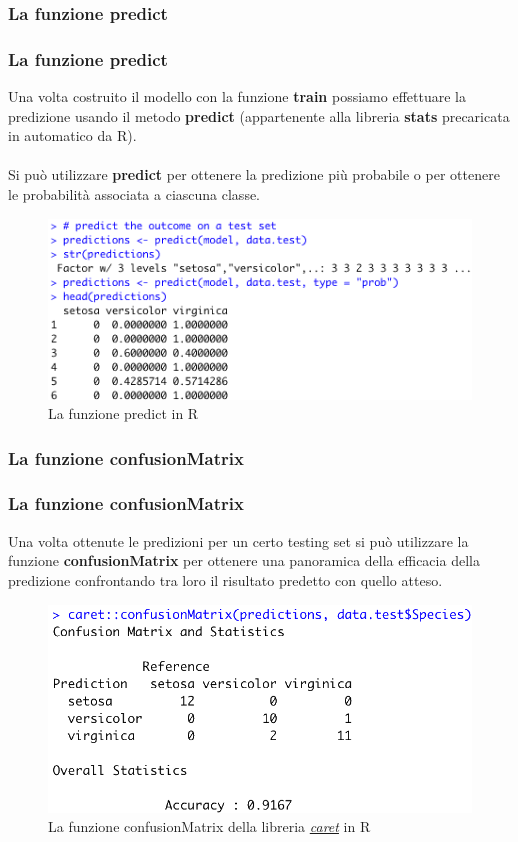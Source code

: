 \subsubsection[La funzione predict]{La funzione predict}
\begin{frame}
	
	\frametitle{La funzione \textbf{predict}}
	
	
	Una volta costruito il modello con la funzione \textbf{train} possiamo effettuare la predizione usando il metodo \textbf{predict} (appartenente alla libreria	 \textbf{stats} precaricata in automatico da R).\\\\
	Si può utilizzare \textbf{predict} per ottenere la predizione più probabile o per ottenere le probabilità associata a ciascuna classe.
	
	\begin{figure}[!htbp]
		\centering
		\includegraphics[width=0.70\linewidth]{images/supervised/coding/caret_predict.png}
		\caption{La funzione predict in R}
	\end{figure}

\end{frame}


\subsubsection[La funzione confusionMatrix]{La funzione confusionMatrix}
\begin{frame}
	
	\frametitle{La funzione \textbf{confusionMatrix}}
	
	
	Una volta ottenute le predizioni per un certo testing set si può utilizzare la funzione \textbf{confusionMatrix} per ottenere una panoramica della efficacia della predizione confrontando tra loro il risultato predetto con quello atteso.
	
	\begin{figure}[!htbp]
		\centering
		\includegraphics[width=0.75\linewidth]{images/supervised/coding/caret_confusion_matrix.png}
		\caption{La funzione confusionMatrix della libreria \href{https://github.com/topepo/caret}{\textit{caret}} in R}
	\end{figure}

\end{frame}